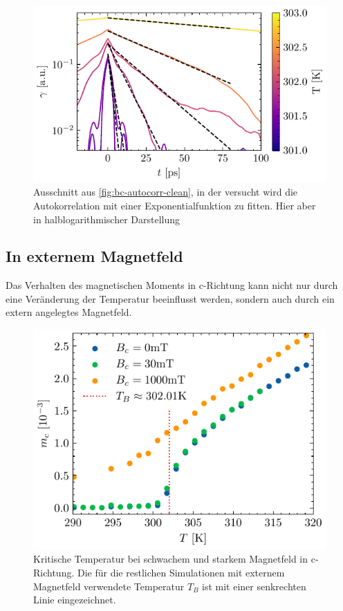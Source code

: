 \documentclass[main.tex]{subfiles}
\begin{document}

\begin{figure}[H]
    \centering
    \includegraphics{bilder/plots/temp_comparison/autocorrelation_cleaned_log.pdf}
    \caption{Ausschnitt aus \cref{fig:bc-autocorr-clean}, in der versucht wird die Autokorrelation mit einer Exponentialfunktion zu fitten. Hier aber in halblogarithmischer Darstellung}\label{fig:temp-autocorr-fit}
\end{figure}

\subsection{In externem Magnetfeld}

Das Verhalten des magnetischen Moments in c-Richtung kann nicht nur durch eine Veränderung der Temperatur beeinflusst werden, sondern auch durch ein extern angelegtes Magnetfeld.

\begin{figure}[H]
    \centering
    \includegraphics{bilder/plots/Bz_comparison/critical_temperature.pdf}
    \caption{Kritische Temperatur bei schwachem und starkem Magnetfeld in c-Richtung. Die für die restlichen Simulationen mit externem Magnetfeld verwendete Temperatur \(T_B\) ist mit einer senkrechten Linie eingezeichnet.}\label{fig:bc-crit-temp}
\end{figure}
\end{document}
